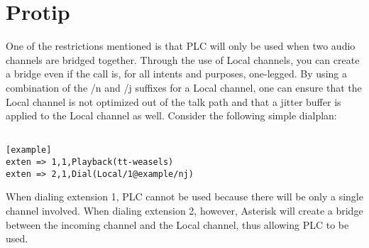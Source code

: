\section{Protip}

	One of the restrictions mentioned is that PLC will only
be used when two audio channels are bridged together. Through the
use of Local channels, you can create a bridge even if the call
is, for all intents and purposes, one-legged. By using a combination
of the /n and /j suffixes for a Local channel, one can ensure
that the Local channel is not optimized out of the talk path
and that a jitter buffer is applied to the Local channel as well.
Consider the following simple dialplan:
\begin{verbatim}

[example]
exten => 1,1,Playback(tt-weasels)
exten => 2,1,Dial(Local/1@example/nj)

\end{verbatim}
When dialing extension 1, PLC cannot be used because there
will be only a single channel involved. When dialing extension
2, however, Asterisk will create a bridge between the incoming
channel and the Local channel, thus allowing PLC to be used.
